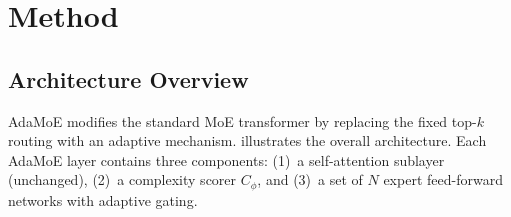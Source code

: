 \documentclass[11pt,a4paper]{article}
\begin{document}
\section{Method}
\label{sec:method}

\subsection{Architecture Overview}

AdaMoE modifies the standard MoE transformer by replacing the fixed top-$k$ routing with
an adaptive mechanism.
 illustrates the overall architecture.
Each AdaMoE layer contains three components: (1)~a self-attention sublayer (unchanged),
(2)~a complexity scorer $C_\phi$, and (3)~a set of $N$ expert feed-forward networks with
adaptive gating.
\end{document}
